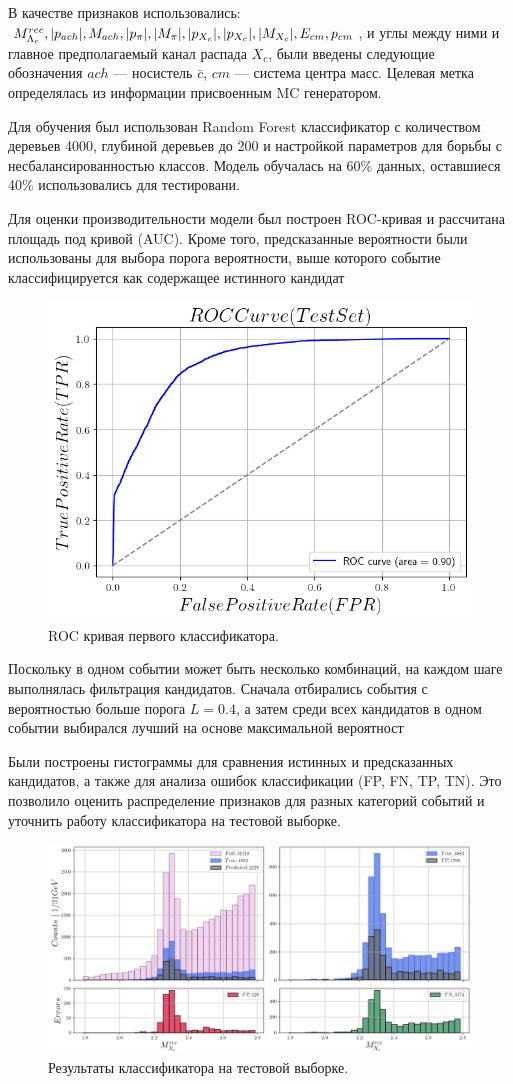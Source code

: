 В качестве признаков использовались: $M^{rec}_{\Lambda_c}, \abs{p_{ach}}, M_{ach}, \abs{p_{\pi}}, \abs{M_{\pi}}, \abs{p_{X_c}}, \abs{p_{X_c}}, \abs{M_{X_c}}, E_{cm}, p_{cm}$, и углы между ними и главное предполагаемый канал распада $X_c$, были введены следующие обозначения $ach$ --- носистель $\bar c$,  $cm$ --- система центра масс. Целевая метка определялась из информации присвоенным MC генератором.


Для обучения был использован Random Forest классификатор с количеством деревьев 4000, глубиной деревьев до 200 и настройкой параметров для борьбы с несбалансированностью классов. Модель обучалась на 60\% данных, оставшиеся 40\% использовались для тестировани.


Для оценки производительности модели был построен ROC-кривая и рассчитана площадь под кривой (AUC). Кроме того, предсказанные вероятности были использованы для выбора порога вероятности, выше которого событие классифицируется как содержащее истинного кандидат

\begin{figure}[H]
    \centering
    \includegraphics[width=0.7\linewidth]{img/ROC_f.png}
    \caption{ROC кривая первого классификатора.}
\end{figure}


Поскольку в одном событии может быть несколько комбинаций, на каждом шаге выполнялась фильтрация кандидатов. Сначала отбирались события с вероятностью больше порога $L = 0.4$, а затем среди всех кандидатов в одном событии выбирался лучший на основе максимальной вероятност


Были построены гистограммы для сравнения истинных и предсказанных кандидатов, а также для анализа ошибок классификации (FP, FN, TP, TN). Это позволило оценить распределение признаков для разных категорий событий и уточнить работу классификатора на тестовой выборке.

\begin{figure}[H]
    \centering
    \includegraphics[width=1\linewidth]{img/MC_res.png}
    \caption{Результаты классификатора на тестовой выборке.}
\end{figure}
